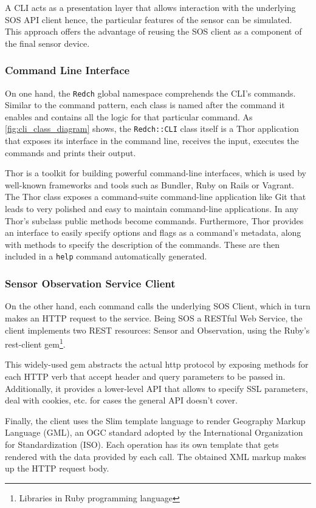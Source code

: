 A CLI acts as a presentation layer that allows interaction with the underlying SOS API client hence, the particular features of the sensor can be simulated. This approach offers the advantage of reusing the SOS client as a component of the final sensor device.

\subsubsection*{Command Line Interface}

On one hand, the \texttt{Redch} global namespace comprehends the CLI's commands. Similar to the command pattern, each class is named after the command it enables and contains all the logic for that particular command. As \ref{fig:cli_class_diagram} shows, the \texttt{Redch::CLI} class itself is a Thor application that exposes its interface in the command line, receives the input, executes the commands and prints their output.

Thor is a toolkit for building powerful command-line interfaces, which is used by well-known frameworks and tools such as Bundler, Ruby on Rails or Vagrant. The Thor class exposes a command-suite command-line application like Git that leads to very polished and easy to maintain command-line applications. In any Thor's subclass public methods become commands. Furthermore, Thor provides an interface to easily specify options and flags as a command's metadata, along with methods to specify the description of the commands. These are then included in a \texttt{help} command automatically generated.

\subsubsection*{Sensor Observation Service Client}

On the other hand, each command calls the underlying SOS Client, which in turn makes an HTTP request to the service. Being SOS a RESTful Web Service, the client implements two REST resources: Sensor and Observation, using the Ruby's rest-client gem\footnote{Libraries in Ruby programming language}.

This widely-used gem abstracts the actual http protocol by exposing methods for each HTTP verb that accept header and query parameters to be passed in. Additionally, it provides a lower-level API that allows to specify SSL parameters, deal with cookies, etc. for cases the general API doesn't cover.

Finally, the client uses the Slim template language to render Geography Markup Language (GML), an OGC standard adopted by the International Organization for Standardization (ISO). Each operation has its own template that gets rendered with the data provided by each call. The obtained XML markup makes up the HTTP request body.

